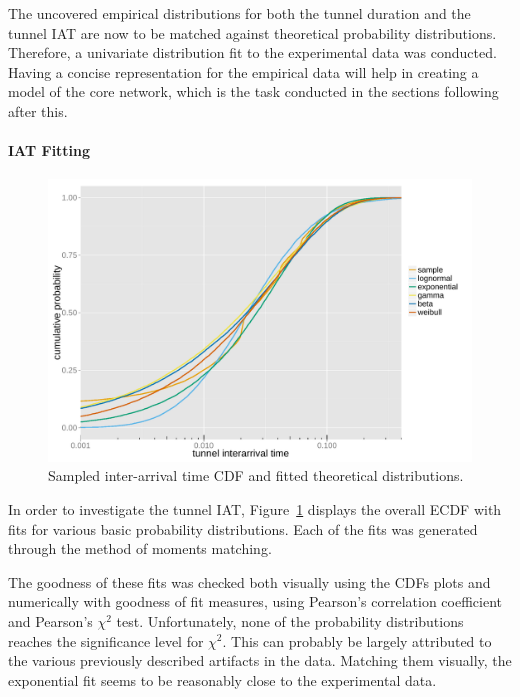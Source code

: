 The uncovered empirical distributions for both the tunnel duration and the tunnel \gls{IAT} are now to be matched against theoretical probability distributions. Therefore, a univariate distribution fit to the experimental data was conducted. Having a concise representation for the empirical data will help in creating a model of the core network, which is the task conducted in the sections following after this.


\paragraph{\gls{IAT} Fitting}

\begin{figure}[htb]
	\centering
	\includegraphics[width=1.0\textwidth]{images/R-IAT-ecdfs.pdf}
	\caption{Sampled inter-arrival time \gls{CDF} and fitted theoretical distributions.}
\label{c4:fig:IAT-cdfs}
\end{figure}

In order to investigate the tunnel \gls{IAT}, Figure~\ref{c4:fig:IAT-cdfs} displays the overall \gls{ECDF} with fits for various basic probability distributions. Each of the fits was generated through the method of moments matching.

The goodness of these fits was checked both visually using the \glspl{CDF} plots and numerically with goodness of fit measures, using Pearson's correlation coefficient and Pearson's $\chi^2$ test. Unfortunately, none of the probability distributions reaches the significance level for $\chi^2$. This can probably be largely attributed to the various previously described artifacts in the data. Matching them visually, the exponential fit seems to be reasonably close to the experimental data.

